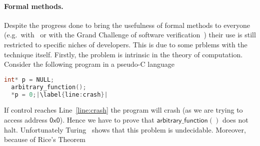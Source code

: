\paragraph*{Formal methods.} Despite the progress done to bring the
usefulness of formal methods to everyone (e.g.\
with~\cite{10.1145/3371078, 10.1145/3338112} or with the Grand
Challenge of software verification~\cite{1621009,Hoare2008,1707636})
their use is still restricted to specific niches of developers. This
is due to some prblems with the technique itself. Firstly, the problem
is intrinsic in the theory of computation. Consider the following
program in a pseudo-C language

\begin{lstlisting}[language=C,escapechar=|]
  int* p = NULL;
  arbitrary_function();
  *p = 0;|\label{line:crash}|
\end{lstlisting}

If control reaches Line~\ref{line:crash} the program will crash (as we
are trying to access address \(\mathsf{0x0}\)). Hence we have to prove
that \(\mathsf{arbitrary\_function()}\) does not halt. Unfortunately
Turing~\cite{10.7551/mitpress/12274.003.0008} shows that this problem
is undecidable. Moreover, because of Rice's
Theorem~\cite{rice1953classes}
